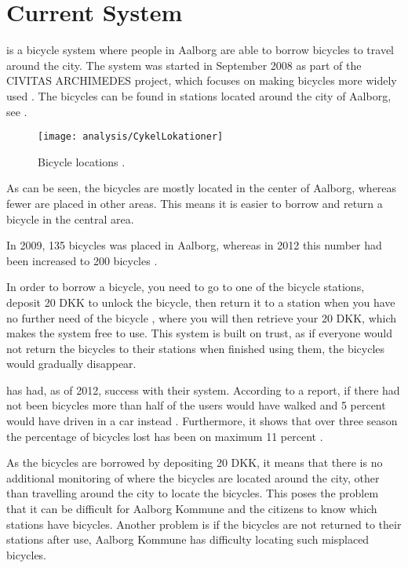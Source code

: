 \section{Current System}


\bycykel is a bicycle system where people in Aalborg are able to borrow bicycles to travel around the city.
The system was started in September 2008 as part of the CIVITAS ARCHIMEDES project, which focuses on making bicycles more widely used \citep{misc:aalborgcykling}.
The bicycles can be found in stations located around the city of Aalborg, see .

\begin{figure}
	\centering
	\texttt{[image: analysis/CykelLokationer]}
	\caption{Bicycle locations \citep{misc:aalborgbycykel}.}
	\label{fig:CykelLokationer}
\end{figure}

As can be seen, the bicycles are mostly located in the center of Aalborg, whereas fewer are placed in other areas.
This means it is easier to borrow and return a bicycle in the central area.

In 2009, 135 bicycles was placed in Aalborg, whereas in 2012 this number had been increased to 200 bicycles \citep{misc:aalborgcykling}.

In order to borrow a bicycle, you need to go to one of the bicycle stations, deposit 20 DKK to unlock the bicycle, then return it to a station when you have no further need of the bicycle \citep{misc:aalborgbycykelregler}, where you will then retrieve your 20 DKK, which makes the system free to use.
This system is built on trust, as if everyone would not return the bicycles to their stations when finished using them, the bicycles would gradually disappear.

\bycykel has had, as of 2012, success with their system. According to a report, if there had not been bicycles more than half of the users would have walked and 5 percent would have driven in a car instead \citep{misc:aalborgcykling}.
Furthermore, it shows that over three season the percentage of bicycles lost has been on maximum 11 percent \citep{misc:aalborgcykling}.

As the bicycles are borrowed by depositing 20 DKK, it means that there is no additional monitoring of where the bicycles are located around the city, other than travelling around the city to locate the bicycles.
This poses the problem that it can be difficult for Aalborg Kommune and the citizens to know which stations have bicycles.
Another problem is if the bicycles are not returned to their stations after use, Aalborg Kommune has difficulty locating such misplaced bicycles.

